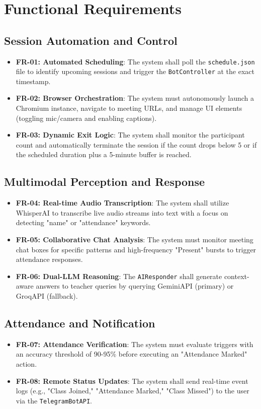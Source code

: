 \documentclass[12pt]{article}
\begin{document}
\newpage
\section{Functional Requirements}

\subsection{Session Automation and Control}
\begin{itemize}
    \item \textbf{FR-01: Automated Scheduling}: The system shall poll the \texttt{schedule.json} file to identify upcoming sessions and trigger the \texttt{BotController} at the exact timestamp.
    \item \textbf{FR-02: Browser Orchestration}: The system must autonomously launch a Chromium instance, navigate to meeting URLs, and manage UI elements (toggling mic/camera and enabling captions).
    \item \textbf{FR-03: Dynamic Exit Logic}: The system shall monitor the participant count and automatically terminate the session if the count drops below 5 or if the scheduled duration plus a 5-minute buffer is reached.
\end{itemize}

\subsection{Multimodal Perception and Response}
\begin{itemize}
    \item \textbf{FR-04: Real-time Audio Transcription}: The system shall utilize WhisperAI to transcribe live audio streams into text with a focus on detecting "name" or "attendance" keywords.
    \item \textbf{FR-05: Collaborative Chat Analysis}: The system must monitor meeting chat boxes for specific patterns and high-frequency "Present" bursts to trigger attendance responses.
    \item \textbf{FR-06: Dual-LLM Reasoning}: The \texttt{AIResponder} shall generate context-aware answers to teacher queries by querying GeminiAPI (primary) or GroqAPI (fallback).
\end{itemize}

\subsection{Attendance and Notification}
\begin{itemize}
    \item \textbf{FR-07: Attendance Verification}: The system must evaluate triggers with an accuracy threshold of 90-95\% before executing an "Attendance Marked" action.
    \item \textbf{FR-08: Remote Status Updates}: The system shall send real-time event logs (e.g., "Class Joined," "Attendance Marked," "Class Missed") to the user via the \texttt{TelegramBotAPI}.
\end{itemize}
\end{document}
